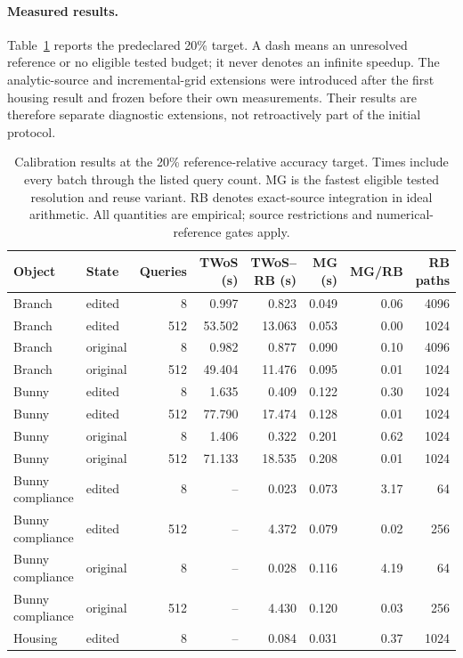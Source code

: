 \paragraph{Measured results.}
Table~\ref{tab:matched-primary} reports the predeclared 20\% target. A dash means an unresolved reference or no eligible tested budget; it never denotes an infinite speedup. The analytic-source and incremental-grid extensions were introduced after the first housing result and frozen before their own measurements. Their results are therefore separate diagnostic extensions, not retroactively part of the initial protocol.
\begin{table}[t]\centering\small
\caption{Calibration results at the 20\% reference-relative accuracy target. Times include every batch through the listed query count. MG is the fastest eligible tested resolution and reuse variant. RB denotes exact-source integration in ideal arithmetic. All quantities are empirical; source restrictions and numerical-reference gates apply.}
\label{tab:matched-primary}
\begin{tabular}{llrrrrrr}\toprule
Object & State & Queries & TWoS (s) & TWoS--RB (s) & MG (s) & MG/RB & RB paths\\\midrule
Branch & edited & 8 & 0.997 & 0.823 & 0.049 & 0.06 & 4096\\
Branch & edited & 512 & 53.502 & 13.063 & 0.053 & 0.00 & 1024\\
Branch & original & 8 & 0.982 & 0.877 & 0.090 & 0.10 & 4096\\
Branch & original & 512 & 49.404 & 11.476 & 0.095 & 0.01 & 1024\\
Bunny & edited & 8 & 1.635 & 0.409 & 0.122 & 0.30 & 1024\\
Bunny & edited & 512 & 77.790 & 17.474 & 0.128 & 0.01 & 1024\\
Bunny & original & 8 & 1.406 & 0.322 & 0.201 & 0.62 & 1024\\
Bunny & original & 512 & 71.133 & 18.535 & 0.208 & 0.01 & 1024\\
Bunny compliance & edited & 8 & -- & 0.023 & 0.073 & 3.17 & 64\\
Bunny compliance & edited & 512 & -- & 4.372 & 0.079 & 0.02 & 256\\
Bunny compliance & original & 8 & -- & 0.028 & 0.116 & 4.19 & 64\\
Bunny compliance & original & 512 & -- & 4.430 & 0.120 & 0.03 & 256\\
Housing & edited & 8 & -- & 0.084 & 0.031 & 0.37 & 1024\\

\end{tabular}
\end{table}
